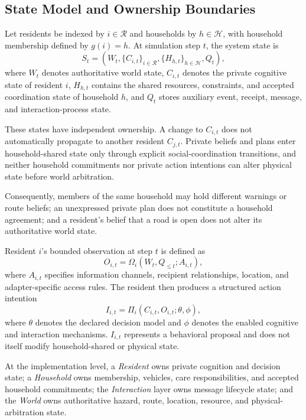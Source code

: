 \documentclass[journal]{IEEEtran}
\begin{document}
\subsection{State Model and Ownership Boundaries}

Let residents be indexed by $i\in\mathcal{R}$ and households by
$h\in\mathcal{H}$, with household membership defined by $g(i)=h$. At simulation
step $t$, the system state is
\begin{equation}
S_t=
\left(
W_t,
\{C_{i,t}\}_{i\in\mathcal{R}},
\{H_{h,t}\}_{h\in\mathcal{H}},
Q_t
\right),
\label{eq:state}
\end{equation}
where $W_t$ denotes authoritative world state, $C_{i,t}$ denotes the private
cognitive state of resident $i$, $H_{h,t}$ contains the shared resources,
constraints, and accepted coordination state of household $h$, and $Q_t$ stores
auxiliary event, receipt, message, and interaction-process state.

These states have independent ownership. A change to $C_{i,t}$ does not
automatically propagate to another resident $C_{j,t}$. Private beliefs and plans
enter household-shared state only through explicit social-coordination
transitions, and neither household commitments nor private action intentions
can alter physical state before world arbitration.

Consequently, members of the same household may hold different warnings or
route beliefs; an unexpressed private plan does not constitute a household
agreement; and a resident's belief that a road is open does not alter its
authoritative world state.

Resident $i$'s bounded observation at step $t$ is defined as
\begin{equation}
O_{i,t}=
\Omega_i\!\left(W_t,Q_{\leq t};A_{i,t}\right),
\label{eq:observation}
\end{equation}
where $A_{i,t}$ specifies information channels, recipient relationships,
location, and adapter-specific access rules. The resident then produces a
structured action intention
\begin{equation}
I_{i,t}=
\Pi_i\!\left(C_{i,t},O_{i,t};\theta,\phi\right),
\label{eq:intention}
\end{equation}
where $\theta$ denotes the declared decision model and $\phi$ denotes the
enabled cognitive and interaction mechanisms. $I_{i,t}$ represents a behavioral
proposal and does not itself modify household-shared or physical state.

At the implementation level, a \emph{Resident} owns private cognition and
decision state; a \emph{Household} owns membership, vehicles, care
responsibilities, and accepted household commitments; the
\emph{Interaction} layer owns message lifecycle state; and the \emph{World}
owns authoritative hazard, route, location, resource, and physical-arbitration
state.
\end{document}

